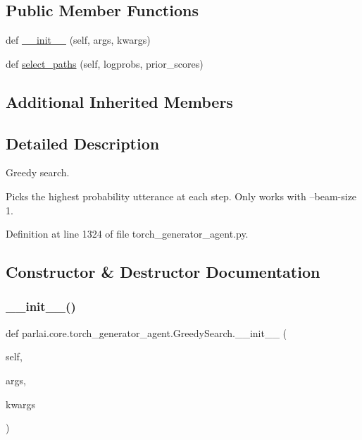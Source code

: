 \subsection*{Public Member Functions}
\begin{DoxyCompactItemize}
\item 
def \hyperlink{classparlai_1_1core_1_1torch__generator__agent_1_1GreedySearch_a3d82930c25aa494772148c51f67d5f0d}{\+\_\+\+\_\+init\+\_\+\+\_\+} (self, args, kwargs)
\item 
def \hyperlink{classparlai_1_1core_1_1torch__generator__agent_1_1GreedySearch_aa201e7824f50e2830cede9adc4bffcd6}{select\+\_\+paths} (self, logprobs, prior\+\_\+scores)
\end{DoxyCompactItemize}
\subsection*{Additional Inherited Members}


\subsection{Detailed Description}
\begin{DoxyVerb}Greedy search.

Picks the highest probability utterance at each step.  Only works with
--beam-size 1.
\end{DoxyVerb}
 

Definition at line 1324 of file torch\+\_\+generator\+\_\+agent.\+py.



\subsection{Constructor \& Destructor Documentation}
\mbox{\label{classparlai_1_1core_1_1torch__generator__agent_1_1GreedySearch_a3d82930c25aa494772148c51f67d5f0d}} 
\subsubsection{\texorpdfstring{\+\_\+\+\_\+init\+\_\+\+\_\+()}{\_\_init\_\_()}}
{\footnotesize\ttfamily def parlai.\+core.\+torch\+\_\+generator\+\_\+agent.\+Greedy\+Search.\+\_\+\+\_\+init\+\_\+\+\_\+ (\begin{DoxyParamCaption}\item[{}]{self,  }\item[{}]{args,  }\item[{}]{kwargs }\end{DoxyParamCaption})}



